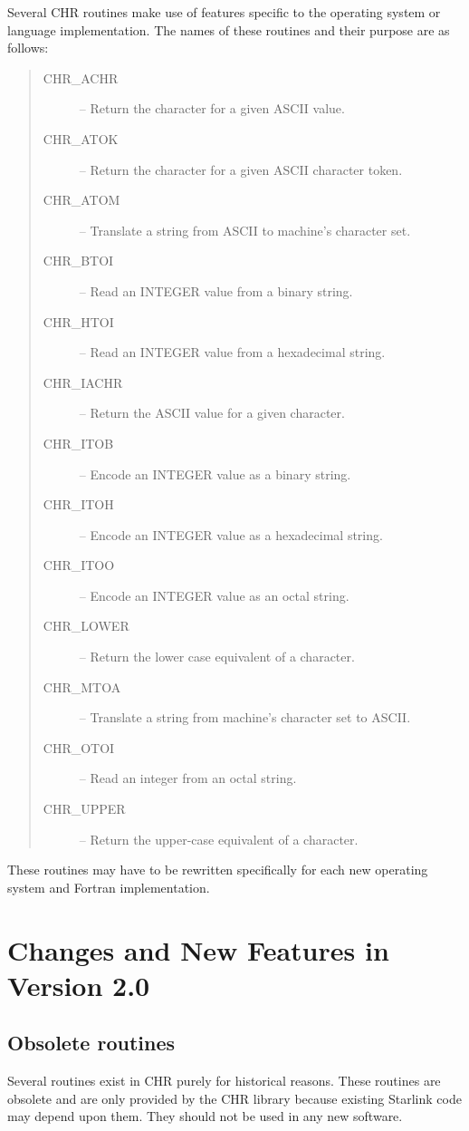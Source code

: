 \documentclass[twoside,11pt,nolof]{starlink}
\begin{document}
Several CHR routines make use of features specific to the operating system or
language implementation.
The names of these routines and their purpose are as follows:

\begin {quote}
\begin{description}
\item [CHR\_ACHR] -- Return the character for a given ASCII value.
\item [CHR\_ATOK] -- Return the character for a given ASCII character token.
\item [CHR\_ATOM] -- Translate a string from ASCII to machine's character set.
\item [CHR\_BTOI] -- Read an INTEGER value from a binary string.
\item [CHR\_HTOI] -- Read an INTEGER value from a hexadecimal string.
\item [CHR\_IACHR] -- Return the ASCII value for a given character.
\item [CHR\_ITOB] -- Encode an INTEGER value as a binary string.
\item [CHR\_ITOH] -- Encode an INTEGER value as a hexadecimal string.
\item [CHR\_ITOO] -- Encode an INTEGER value as an octal string.
\item [CHR\_LOWER] -- Return the lower case equivalent of a character.
\item [CHR\_MTOA] -- Translate a string from machine's character set to ASCII.
\item [CHR\_OTOI] -- Read an integer from an octal string.
\item [CHR\_UPPER] -- Return the upper-case equivalent of a character.
\end {description}
\end {quote}

These routines may have to be rewritten specifically for each new
operating system and Fortran implementation.


\section {Changes and New Features in Version 2.0}

\subsection {Obsolete routines}

Several routines exist in CHR purely for historical reasons.
These routines are obsolete and are only provided by the CHR library because
existing Starlink code may depend upon them.
They should not be used in any new software.
\end{document}
